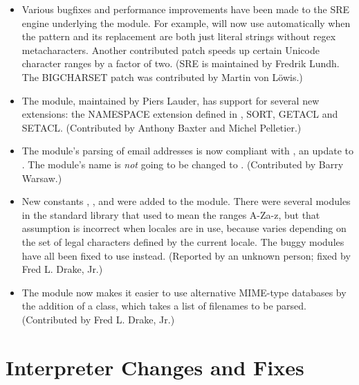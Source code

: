 \documentclass{howto}
\begin{document}
\begin{itemize}
  \item Various bugfixes and performance improvements have been made
  to the SRE engine underlying the  module.  For example,
   will now use 
  automatically when the pattern and its replacement are both just
  literal strings without regex metacharacters.  Another contributed
  patch speeds up certain Unicode character ranges by a factor of
  two. (SRE is maintained by Fredrik Lundh.  The BIGCHARSET patch was
  contributed by Martin von L\"owis.)

  \item The  module, maintained by Piers Lauder, has
  support for several new extensions: the NAMESPACE extension defined
  in , SORT, GETACL and SETACL.  (Contributed by Anthony
  Baxter and Michel Pelletier.)

  \item The  module's parsing of email addresses is
  now compliant with , an update to .  The module's
  name is \emph{not} going to be changed to .
  (Contributed by Barry Warsaw.)

  \item New constants ,
  , and  were
  added to the  module.  There were several modules in
  the standard library that used  to mean the
  ranges A-Za-z, but that assumption is incorrect when locales are in
  use, because  varies depending on the set
  of legal characters defined by the current locale.  The buggy
  modules have all been fixed to use  instead.
  (Reported by an unknown person; fixed by Fred L. Drake, Jr.)

  \item The  module now makes it easier to use
  alternative MIME-type databases by the addition of a
   class, which takes a list of filenames to be
  parsed.  (Contributed by Fred L. Drake, Jr.)

\end{itemize}


\section{Interpreter Changes and Fixes}
\end{document}
